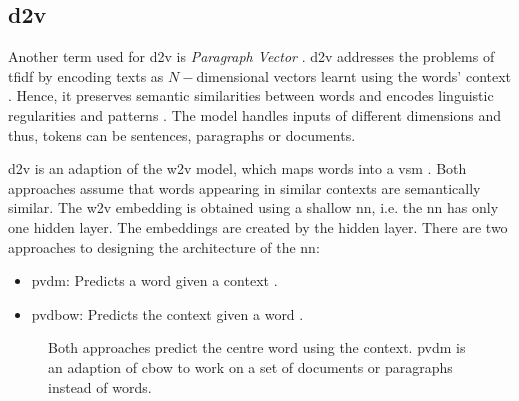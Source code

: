 \subsection{\acl*{d2v}}\label{subsec:doc2vec}

Another term used for \ac{d2v} is \textit{Paragraph Vector} \cite{clusteringDocs2020, SentRep2014}.
\ac{d2v} addresses the problems of \ac{tfidf} by encoding texts as $N-$dimensional vectors learnt using the words' context \cite{clusteringDocs2020}.
Hence, it preserves semantic similarities between words and encodes linguistic regularities and patterns \cite{SkipGram2013}.
The model handles inputs of different dimensions and thus, tokens can be sentences, paragraphs or documents.

\ac{d2v} is an adaption of the \ac{w2v} model, which maps words into a \ac{vsm} \cite{clusteringDocs2020}.
Both approaches assume that words appearing in similar contexts are semantically similar. %
The \ac{w2v} embedding is obtained using a shallow \ac{nn}, i.e. the \ac{nn} has only one hidden layer.
The embeddings are created by the hidden layer.
There are two approaches to designing the architecture of the \ac{nn}:
\begin{itemize}
    \item \ac{pvdm}: 
        Predicts a word given a context \cite{SentRep2014, WordRep2013}.
    \item \ac{pvdbow}: 
        Predicts the context given a word \cite{EmbDist2015, SkipGram2013, SentRep2014}.
\end{itemize}


\begin{figure}%
    \centering
    \qquad
    \caption[\ac{cbow} and \ac{pvdm} architecture]{Both approaches predict the centre word using the context.
    \ac{pvdm} is an adaption of \ac{cbow} to work on a set of documents or paragraphs instead of words.
    }%
    \label{fig:pvdm}%
\end{figure}
 
